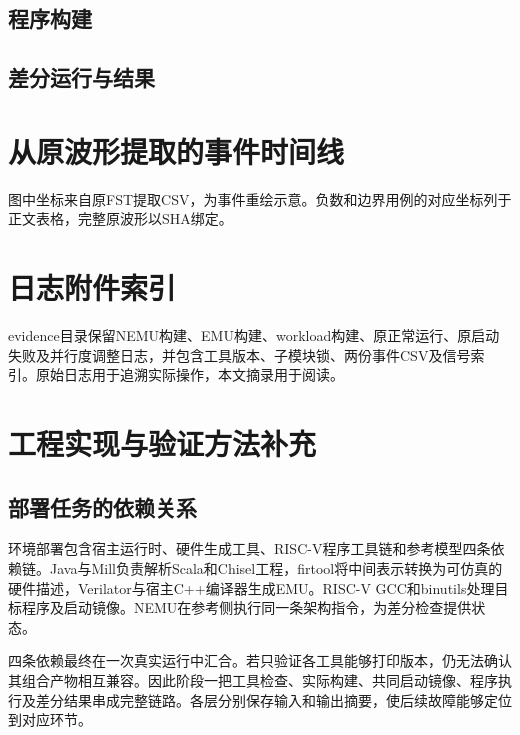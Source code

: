 \subsection{程序构建}
\subsection{差分运行与结果}
\section{从原波形提取的事件时间线}


图中坐标来自原FST提取CSV，为事件重绘示意。负数和边界用例的对应坐标列于正文表格，完整原波形以SHA绑定。
\section{日志附件索引}
evidence目录保留NEMU构建、EMU构建、workload构建、原正常运行、原启动失败及并行度调整日志，并包含工具版本、子模块锁、两份事件CSV及信号索引。原始日志用于追溯实际操作，本文摘录用于阅读。
\section{工程实现与验证方法补充}


\subsection{部署任务的依赖关系}


环境部署包含宿主运行时、硬件生成工具、RISC-V程序工具链和参考模型四条依赖链。Java与Mill负责解析Scala和Chisel工程，firtool将中间表示转换为可仿真的硬件描述，Verilator与宿主C++编译器生成EMU。RISC-V GCC和binutils处理目标程序及启动镜像。NEMU在参考侧执行同一条架构指令，为差分检查提供状态。\par


四条依赖最终在一次真实运行中汇合。若只验证各工具能够打印版本，仍无法确认其组合产物相互兼容。因此阶段一把工具检查、实际构建、共同启动镜像、程序执行及差分结果串成完整链路。各层分别保存输入和输出摘要，使后续故障能够定位到对应环节。\par


